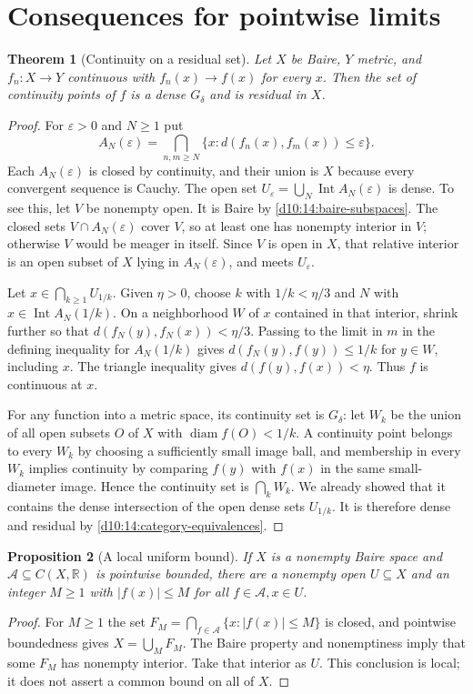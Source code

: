 \documentclass[11pt,oneside,openany]{book}
\newtheorem{theorem}{Theorem}[chapter]
\newtheorem{proposition}[theorem]{Proposition}
\theoremstyle{definition}
\theoremstyle{remark}
\newcommand{\R}{\mathbb R}\newcommand{\C}{\mathbb C}
\newcommand{\eps}{\varepsilon}
\DeclareMathOperator{\Int}{Int}
\DeclareMathOperator{\diam}{diam}
\begin{document}
\section{Consequences for pointwise limits}

\begin{theorem}[Continuity on a residual set]\label{d10:14:baire-one}
Let $X$ be Baire, $Y$ metric, and $f_n:X\to Y$ continuous with $f_n(x)\to f(x)$ for every $x$. Then the set of continuity points of $f$ is a dense $G_\delta$ and is residual in $X$.
\end{theorem}
\begin{proof}
For $\eps>0$ and $N\geq1$ put
\[
 A_N(\eps)=\bigcap_{n,m\geq N}\{x:d(f_n(x),f_m(x))\leq\eps\}.
\]
Each $A_N(\eps)$ is closed by continuity, and their union is $X$ because every convergent sequence is Cauchy. The open set $U_\eps=\bigcup_N\Int A_N(\eps)$ is dense. To see this, let $V$ be nonempty open. It is Baire by \cref{d10:14:baire-subspaces}. The closed sets $V\cap A_N(\eps)$ cover $V$, so at least one has nonempty interior in $V$; otherwise $V$ would be meager in itself. Since $V$ is open in $X$, that relative interior is an open subset of $X$ lying in $A_N(\eps)$, and meets $U_\eps$.

Let $x\in\bigcap_{k\geq1}U_{1/k}$. Given $\eta>0$, choose $k$ with $1/k<\eta/3$ and $N$ with $x\in\Int A_N(1/k)$. On a neighborhood $W$ of $x$ contained in that interior, shrink further so that $d(f_N(y),f_N(x))<\eta/3$. Passing to the limit in $m$ in the defining inequality for $A_N(1/k)$ gives $d(f_N(y),f(y))\leq1/k$ for $y\in W$, including $x$. The triangle inequality gives $d(f(y),f(x))<\eta$. Thus $f$ is continuous at $x$.

For any function into a metric space, its continuity set is $G_\delta$: let $W_k$ be the union of all open subsets $O$ of $X$ with $\diam f(O)<1/k$. A continuity point belongs to every $W_k$ by choosing a sufficiently small image ball, and membership in every $W_k$ implies continuity by comparing $f(y)$ with $f(x)$ in the same small-diameter image. Hence the continuity set is $\bigcap_kW_k$. We already showed that it contains the dense intersection of the open dense sets $U_{1/k}$. It is therefore dense and residual by \cref{d10:14:category-equivalences}.
\end{proof}

\begin{proposition}[A local uniform bound]\label{d10:14:local-uniform-boundedness}
If $X$ is a nonempty Baire space and $\mathcal A\subseteq C(X,\R)$ is pointwise bounded, there are a nonempty open $U\subseteq X$ and an integer $M\geq1$ with $|f(x)|\leq M$ for all $f\in\mathcal A,x\in U$.
\end{proposition}
\begin{proof}
For $M\geq1$ the set $F_M=\bigcap_{f\in\mathcal A}\{x:|f(x)|\leq M\}$ is closed, and pointwise boundedness gives $X=\bigcup_MF_M$. The Baire property and nonemptiness imply that some $F_M$ has nonempty interior. Take that interior as $U$. This conclusion is local; it does not assert a common bound on all of $X$.
\end{proof}
\end{document}
